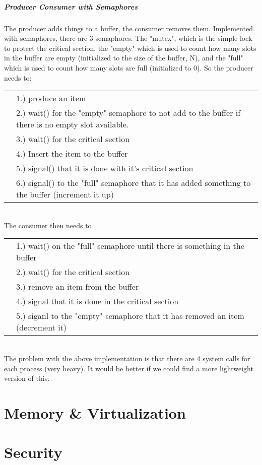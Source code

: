 \documentclass[12pt]{article}
\theoremstyle{definition}
\begin{document}
\subsubsection{Producer Consumer with Semaphores}
The producer adds things to a buffer, the consumer removes them. Implemented with semaphores, there are 3 semaphores. The "mutex", which is the simple lock to protect the critical section, the "empty" which is used to count how many slots in the buffer are empty (initialized to the size of the buffer, N), and the "full" which is used to count how many slots are full (initialized to 0). So the producer needs to:\\
\begin{tabular}{l l}
	&1.) produce an item \\
	&2.) wait() for the "empty" semaphore to not add to the buffer if there is no empty slot available.\\
	&3.) wait() for the critical section\\
	&4.) Insert the item to the buffer\\
	&5.) signal() that it is done with it's critical section\\
	&6.) signal() to the "full" semaphore that it has added something to the buffer (increment it up)
	
\end{tabular}\\
The consumer then needs to\\
\begin{tabular}{l l}
	&1.) wait() on the "full" semaphore until there is something in the buffer \\
	&2.) wait() for the critical section \\
	&3.) remove an item from the buffer \\
	&4.) signal that it is done in the critical section \\
	&5.) siganl to the "empty" semaphore that it has removed an item (decrement it)\\
\end{tabular}\\
The problem with the above implementation is that there are 4 system calls for each process (very heavy). It would be better if we could find a more lightweight version of this.
\\ \linebreak

\part{Memory \& Virtualization}

\part{Security}
\end{document}
